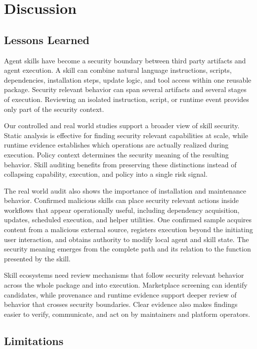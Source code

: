 \section{Discussion}
\label{sec:discussion}

\subsection{Lessons Learned}

Agent skills have become a security boundary between third party artifacts and
agent execution. A skill can combine natural language instructions, scripts,
dependencies, installation steps, update logic, and tool access within one
reusable package. Security relevant behavior can span several artifacts and
several stages of execution. Reviewing an isolated instruction, script, or
runtime event provides only part of the security context.

Our controlled and real world studies support a broader view of skill
security. Static analysis is effective for finding security relevant
capabilities at scale, while runtime evidence establishes which operations are
actually realized during execution. Policy context determines the security
meaning of the resulting behavior. Skill auditing benefits from preserving
these distinctions instead of collapsing capability, execution, and policy
into a single risk signal.

The real world audit also shows the importance of installation and maintenance
behavior. Confirmed malicious skills can place security relevant actions inside
workflows that appear operationally useful, including dependency acquisition,
updates, scheduled execution, and helper utilities. One confirmed sample
acquires content from a malicious external source, registers execution beyond
the initiating user interaction, and obtains authority to modify local agent
and skill state. The security meaning emerges from the complete path and its
relation to the function presented by the skill.

Skill ecosystems need review mechanisms that follow security relevant behavior
across the whole package and into execution. Marketplace screening can identify
candidates, while provenance and runtime evidence support deeper review of
behavior that crosses security boundaries. Clear evidence also makes findings
easier to verify, communicate, and act on by maintainers and platform
operators.


\subsection{Limitations}

